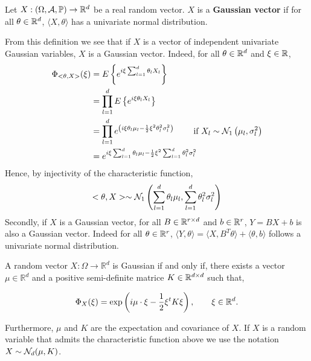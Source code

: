 \documentclass{article}
\begin{document}
\begin{definition}
  Let $X:(\Omega,\mathcal{A},\mathbb{P}) \to \mathbb{R}^{d}$ be a real random vector. $X$ is a \textbf{Gaussian
    vector} if for all $\theta \in \mathbb{R}^{d}$, $\langle X, \theta \rangle$ has a
  univariate normal distribution.
\end{definition}
From this definition we see that if $X$ is a vector of independent univariate
Gaussian variables, $X$ is a Gaussian vector. Indeed, for all $\theta \in \mathbb{R}^{d}$
and $\xi \in \mathbb{R}$, 
$$
\begin{aligned}
  \Phi_{<\theta, X>}(\xi ) &=E\left\{e^{i \xi \sum_{l=1}^{d} \theta_{l} X_{l}}\right\} \\
  &=\prod_{l=1}^{d} E\left\{e^{i \xi \theta_{l} X_{l}}\right\} \\
  &=\prod_{l=1}^{d} e^{\left(i \xi \theta_{l} \mu_{l}-\frac{1}{2} \xi^{2} \theta_{l}^{2}
      \sigma_{l}^{2}\right)} \qquad \text { if } X_{l} \sim
  \mathcal{N}_{1}\left(\mu_{l}, \sigma_{l}^2 \right) \\
  &=e^{i \xi \sum_{l=1}^{d} \theta_{l} \mu_{l}-\frac{1}{2} \xi^{2} \sum_{l=1}^{d} \theta_{l}^{2} \sigma_{l}^{2}}
\end{aligned}
$$
Hence, by injectivity of the characteristic function,
$$
<\theta, X>\sim \mathcal{N}_{1}\left(\sum_{l=1}^d \theta_{l} \mu_{l}, \sum_{l=1}^d \theta_{l}^{2} \sigma_{l}^{2}\right)
$$
Secondly, if $X$ is a Gaussian vector, for all $B \in \mathbb{R}^{r \times d}$ and $b
\in \mathbb{R}^r$, $Y = BX + b$ is also a Gaussian vector. Indeed for all $\theta \in
\mathbb{R}^r$, $\langle Y,\theta \rangle = \langle X,B^T\theta \rangle + \langle
\theta,b \rangle$ follows a univariate normal distribution.

\begin{theorem} A random vector $X: \Omega \rightarrow \mathbb{R}^{d}$ is
  Gaussian if and only if, there exists a vector $\mu \in \mathbb{R}^{d}$ and a
  positive semi-definite matrice $K \in \mathbb{R}^{d \times d}$ such that, 
  
  \begin{equation} \label{eq:th}
    \Phi_{X}(\xi)=\exp \left(i \mu \cdot \xi-\frac{1}{2} \xi^t K \xi\right),
    \qquad \xi \in \mathbb{R}^{d}.
  \end{equation}
  
  Furthermore, $\mu$ and $K$ are the expectation and covariance of $X$. If $X$
  is a random variable that admits the characteristic function above we use the
  notation $X \sim \mathcal{N}_d(\mu,K)$. 
\end{theorem}
\end{document}

